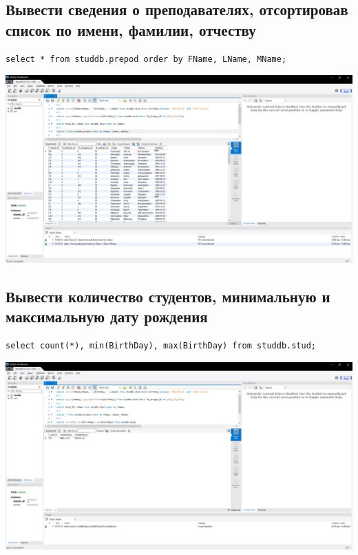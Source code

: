 \documentclass[a4paper, 12pt]{article}
\begin{document}
\subsection{Вывести сведения о преподавателях,  отсортировав  список по имени, фамилии, отчеству}
\begin{lstlisting}
select * from studdb.prepod order by FName, LName, MName;
\end{lstlisting}
\includegraphics[width=\textwidth]{5-4.png}

\subsection{Вывести количество студентов, минимальную  и максимальную дату рождения}
\begin{lstlisting}
select count(*), min(BirthDay), max(BirthDay) from studdb.stud;
\end{lstlisting}
\includegraphics[width=\textwidth]{5-5.png}
\end{document}
